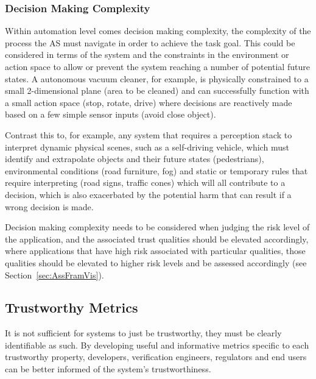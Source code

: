 \subsubsection{Decision Making Complexity} \label{sec:appcrit-dec}

Within automation level comes decision making complexity, the complexity of the process the AS must navigate in order to achieve the task goal. This could be considered in terms of the system and the constraints in the environment or action space to allow or prevent the system reaching a number of potential future states. A autonomous vacuum cleaner, for example, is physically constrained to a small 2-dimensional plane (area to be cleaned) and can successfully function with a small action space (stop, rotate, drive) where decisions are reactively made based on a few simple sensor inputs (avoid close object). 

Contrast this to, for example, any system that requires a perception stack to interpret dynamic physical scenes, such as a self-driving vehicle, which must identify and extrapolate objects and their future states (pedestrians), environmental conditions (road furniture, fog) and static or temporary rules that require interpreting (road signs, traffic cones) which will all contribute to a decision, which is also exacerbated by the potential harm that can result if a wrong decision is made. 

Decision making complexity needs to be considered when judging the risk level of the application, and the associated trust qualities should be elevated accordingly, where applications that have high risk associated with particular qualities, those qualities should be elevated to higher risk levels and be assessed accordingly (see Section~\ref{sec:AssFramVis}). 


\subsection{Trustworthy Metrics}

It is not sufficient for systems to just be trustworthy, they must be clearly identifiable as such. By developing useful and informative metrics specific to each trustworthy property, developers, verification engineers, regulators and end users can be better informed of the system's trustworthiness.

